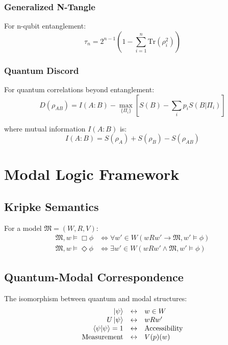 \documentclass[12pt]{article}
\begin{document}
\subsubsection{Generalized N-Tangle}
For n-qubit entanglement:
\begin{equation}
    \tau_n = 2^{n-1}\left(1 - \sum_{i=1}^n \text{Tr}(\rho_i^2)\right)
\end{equation}

\subsubsection{Quantum Discord}
For quantum correlations beyond entanglement:
\begin{equation}
    D(\rho_{AB}) = I(A:B) - \max_{\{\Pi_i\}}\left[S(B) - \sum_i p_i S(B|\Pi_i)\right]
\end{equation}

where mutual information $I(A:B)$ is:
\begin{equation}
    I(A:B) = S(\rho_A) + S(\rho_B) - S(\rho_{AB})
\end{equation}

\section{Modal Logic Framework}

\subsection{Kripke Semantics}
For a model $\mathfrak{M} = (W, R, V)$:
\begin{align}
    \mathfrak{M}, w \vDash \Box\phi &\iff \forall w' \in W(wRw' \rightarrow \mathfrak{M}, w' \vDash \phi) \\
    \mathfrak{M}, w \vDash \Diamond\phi &\iff \exists w' \in W(wRw' \wedge \mathfrak{M}, w' \vDash \phi)
\end{align}

\subsection{Quantum-Modal Correspondence}
The isomorphism between quantum and modal structures:
\begin{equation}
    \begin{array}{rcl}
        \ket{\psi} & \leftrightarrow & w \in W \\
        U\ket{\psi} & \leftrightarrow & wRw' \\
        \braket{\psi|\psi} = 1 & \leftrightarrow & \text{Accessibility} \\
        \text{Measurement} & \leftrightarrow & V(p)(w)
    \end{array}
\end{equation}
\end{document}
